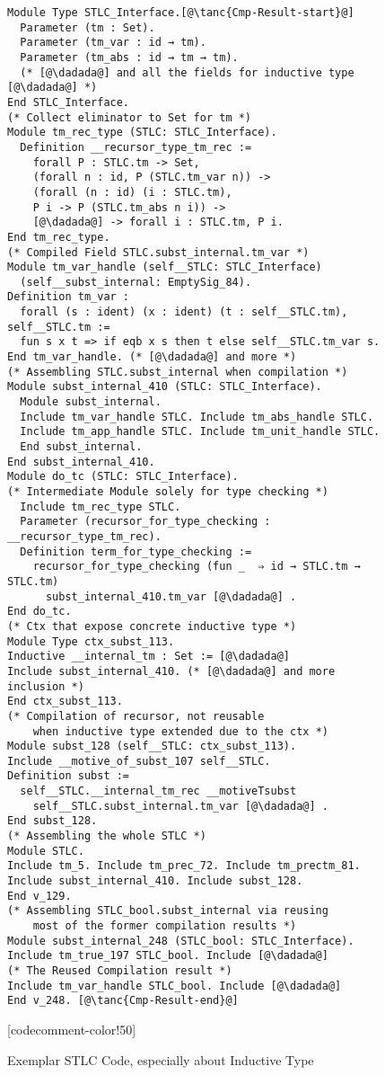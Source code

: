 \begin{figure}
\begin{minipage}{\textwidth}
\begin{multicols}{2}
\begin{lstlisting}
Module Type STLC_Interface.[@\tanc{Cmp-Result-start}@]
  Parameter (tm : Set).
  Parameter (tm_var : id → tm).
  Parameter (tm_abs : id → tm → tm).
  (* [@\dadada@] and all the fields for inductive type [@\dadada@] *)
End STLC_Interface.
(* Collect eliminator to Set for tm *)
Module tm_rec_type (STLC: STLC_Interface).
  Definition __recursor_type_tm_rec :=
    forall P : STLC.tm -> Set,
    (forall n : id, P (STLC.tm_var n)) ->
    (forall (n : id) (i : STLC.tm),
    P i -> P (STLC.tm_abs n i)) ->
    [@\dadada@] -> forall i : STLC.tm, P i.
End tm_rec_type.
(* Compiled Field STLC.subst_internal.tm_var *)
Module tm_var_handle (self__STLC: STLC_Interface)
  (self__subst_internal: EmptySig_84).
Definition tm_var :
  forall (s : ident) (x : ident) (t : self__STLC.tm), self__STLC.tm :=
  fun s x t => if eqb x s then t else self__STLC.tm_var s.
End tm_var_handle. (* [@\dadada@] and more *)
(* Assembling STLC.subst_internal when compilation *)
Module subst_internal_410 (STLC: STLC_Interface). 
  Module subst_internal.
  Include tm_var_handle STLC. Include tm_abs_handle STLC.
  Include tm_app_handle STLC. Include tm_unit_handle STLC.
  End subst_internal.
End subst_internal_410.
Module do_tc (STLC: STLC_Interface).
(* Intermediate Module solely for type checking *)
  Include tm_rec_type STLC.
  Parameter (recursor_for_type_checking : __recursor_type_tm_rec).
  Definition term_for_type_checking :=
    recursor_for_type_checking (fun _  ⇒ id → STLC.tm → STLC.tm)
      subst_internal_410.tm_var [@\dadada@] .
End do_tc.
(* Ctx that expose concrete inductive type *)
Module Type ctx_subst_113.
Inductive __internal_tm : Set := [@\dadada@] 
Include subst_internal_410. (* [@\dadada@] and more inclusion *)
End ctx_subst_113.
(* Compilation of recursor, not reusable
    when inductive type extended due to the ctx *)
Module subst_128 (self__STLC: ctx_subst_113).
Include __motive_of_subst_107 self__STLC.
Definition subst :=
  self__STLC.__internal_tm_rec __motiveTsubst
	self__STLC.subst_internal.tm_var [@\dadada@] .
End subst_128.
(* Assembling the whole STLC *)
Module STLC.
Include tm_5. Include tm_prec_72. Include tm_prectm_81.
Include subst_internal_410. Include subst_128.
End v_129.
(* Assembling STLC_bool.subst_internal via reusing 
    most of the former compilation results *)
Module subst_internal_248 (STLC_bool: STLC_Interface).
Include tm_true_197 STLC_bool. Include [@\dadada@]
(* The Reused Compilation result *)
Include tm_var_handle STLC_bool. Include [@\dadada@]
End v_248. [@\tanc{Cmp-Result-end}@]

\end{lstlisting}

[codecomment-color!50]

\vspace{-5pt}

\end{multicols}
\end{minipage}

\caption{Exemplar STLC Code, especially about Inductive Type}\label{fig:plugin-example2}
\end{figure}